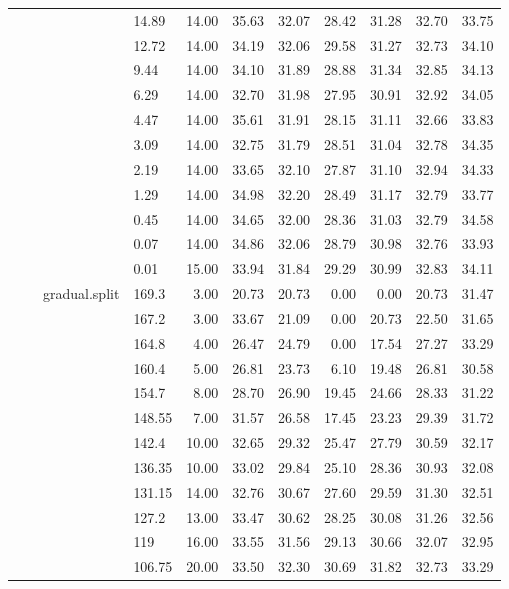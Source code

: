 \begin{longtable}{llllrrrrrrr}
   &  &  & 14.89 & 14.00 & 35.63 & 32.07 & 28.42 & 31.28 & 32.70 & 33.75 \\ 
   &  &  & 12.72 & 14.00 & 34.19 & 32.06 & 29.58 & 31.27 & 32.73 & 34.10 \\ 
   &  &  & 9.44 & 14.00 & 34.10 & 31.89 & 28.88 & 31.34 & 32.85 & 34.13 \\ 
   &  &  & 6.29 & 14.00 & 32.70 & 31.98 & 27.95 & 30.91 & 32.92 & 34.05 \\ 
   &  &  & 4.47 & 14.00 & 35.61 & 31.91 & 28.15 & 31.11 & 32.66 & 33.83 \\ 
   &  &  & 3.09 & 14.00 & 32.75 & 31.79 & 28.51 & 31.04 & 32.78 & 34.35 \\ 
   &  &  & 2.19 & 14.00 & 33.65 & 32.10 & 27.87 & 31.10 & 32.94 & 34.33 \\ 
   &  &  & 1.29 & 14.00 & 34.98 & 32.20 & 28.49 & 31.17 & 32.79 & 33.77 \\ 
   &  &  & 0.45 & 14.00 & 34.65 & 32.00 & 28.36 & 31.03 & 32.79 & 34.58 \\ 
   &  &  & 0.07 & 14.00 & 34.86 & 32.06 & 28.79 & 30.98 & 32.76 & 33.93 \\ 
   &  &  & 0.01 & 15.00 & 33.94 & 31.84 & 29.29 & 30.99 & 32.83 & 34.11 \\ 
   &  & gradual.split & 169.3 & 3.00 & 20.73 & 20.73 & 0.00 & 0.00 & 20.73 & 31.47 \\ 
   &  &  & 167.2 & 3.00 & 33.67 & 21.09 & 0.00 & 20.73 & 22.50 & 31.65 \\ 
   &  &  & 164.8 & 4.00 & 26.47 & 24.79 & 0.00 & 17.54 & 27.27 & 33.29 \\ 
   &  &  & 160.4 & 5.00 & 26.81 & 23.73 & 6.10 & 19.48 & 26.81 & 30.58 \\ 
   &  &  & 154.7 & 8.00 & 28.70 & 26.90 & 19.45 & 24.66 & 28.33 & 31.22 \\ 
   &  &  & 148.55 & 7.00 & 31.57 & 26.58 & 17.45 & 23.23 & 29.39 & 31.72 \\ 
   &  &  & 142.4 & 10.00 & 32.65 & 29.32 & 25.47 & 27.79 & 30.59 & 32.17 \\ 
   &  &  & 136.35 & 10.00 & 33.02 & 29.84 & 25.10 & 28.36 & 30.93 & 32.08 \\ 
   &  &  & 131.15 & 14.00 & 32.76 & 30.67 & 27.60 & 29.59 & 31.30 & 32.51 \\ 
   &  &  & 127.2 & 13.00 & 33.47 & 30.62 & 28.25 & 30.08 & 31.26 & 32.56 \\ 
   &  &  & 119 & 16.00 & 33.55 & 31.56 & 29.13 & 30.66 & 32.07 & 32.95 \\ 
   &  &  & 106.75 & 20.00 & 33.50 & 32.30 & 30.69 & 31.82 & 32.73 & 33.29 \\ 

\end{longtable}
